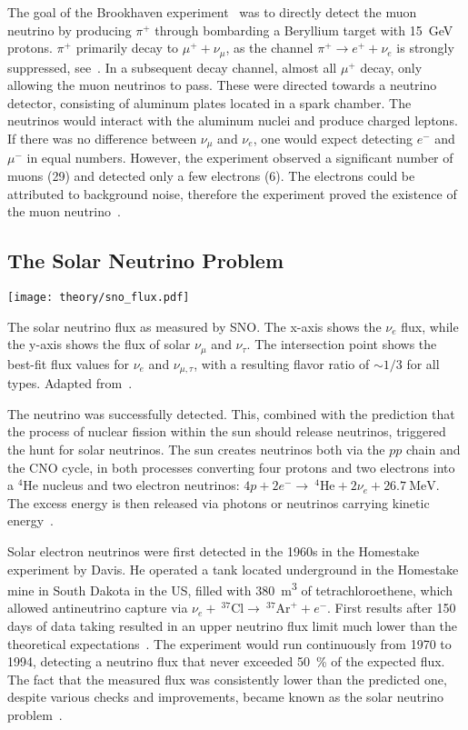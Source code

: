 The goal of the Brookhaven experiment~ was to directly detect the muon neutrino by producing $\pi^+$ through bombarding a Beryllium target with \SI{15}{\giga\eV} protons. $\pi^+$ primarily decay to $\mu^+ + \nu_\mu$, as the channel $\pi^+ \rightarrow e^+ + \nu_e$ is strongly suppressed, see~\cite{Bilenky2012}. In a subsequent decay channel, almost all $\mu^+$ decay, only allowing the muon neutrinos to pass. These were directed towards a neutrino detector, consisting of aluminum plates located in a spark chamber. The neutrinos would interact with the aluminum nuclei and produce charged leptons. If there was no difference between $\nu_\mu$ and $\nu_e$, one would expect detecting $e^-$ and $\mu^-$ in equal numbers. However, the experiment observed a significant number of muons (29) and detected only a few electrons (6). The electrons could be attributed to background noise, therefore the experiment proved the existence of the muon neutrino~\cite{Danby1962}.

\subsection{The Solar Neutrino Problem}

\begin{marginfigure}
    \texttt{[image: theory/sno\_flux.pdf]}
    \caption[Solar neutrino flux measured by SNO]{The solar neutrino flux as measured by SNO\@. The x-axis shows the $\nu_e$ flux, while the y-axis shows the flux of solar $\nu_\mu$ and $\nu_\tau$. The intersection point shows the best-fit flux values for $\nu_e$ and $\nu_{\mu,\tau}$, with a resulting flavor ratio of $\sim1/3$ for all types. Adapted from~\cite{Ahmad2002}.}
\end{marginfigure}

The neutrino was successfully detected. This, combined with the prediction that the process of nuclear fission within the sun should release neutrinos, triggered the hunt for solar neutrinos. The sun creates neutrinos both via the $pp$ chain and the CNO cycle, in both processes converting four protons and two electrons into a $^4\text{He}$ nucleus and two electron neutrinos: $4p + 2e^- \rightarrow  ~^4\text{He} + 2\nu_e + \SI{26.7}{\mega\eV}$. The excess energy is then released via photons or neutrinos carrying kinetic energy~\cite{Giunti2007}.

Solar electron neutrinos were first detected in the 1960s in the Homestake experiment by Davis. He operated a tank located underground in the Homestake mine in South Dakota in the US, filled with \SI{380}{\meter\cubed} of tetrachloroethene, which allowed antineutrino capture via $\nu_e +~ ^{37}\text{Cl} \rightarrow ~ ^{37}\text{Ar}^+ + e^-$. First results after 150 days of data taking resulted in an upper neutrino flux limit much lower than the theoretical expectations~. The experiment would run continuously from 1970 to 1994, detecting a neutrino flux that never exceeded \SI{50}{\percent} of the expected flux. The fact that the measured flux was consistently lower than the predicted one, despite various checks and improvements, became known as the solar neutrino problem~.

